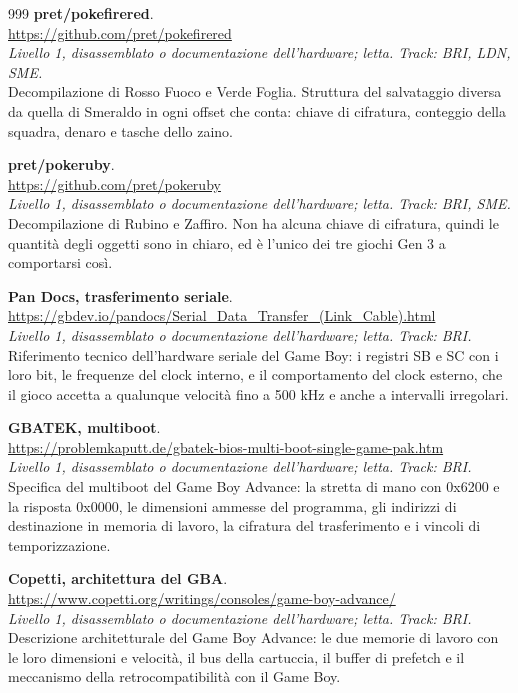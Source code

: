 \begin{thebibliography}{999}
  \textbf{pret/pokefirered}.
  \\ \url{https://github.com/pret/pokefirered}
  \\ \emph{Livello 1, disassemblato o documentazione dell'hardware; letta. Track: BRI, LDN, SME.}
  \\ Decompilazione di Rosso Fuoco e Verde Foglia. Struttura del salvataggio diversa da quella di Smeraldo in ogni offset che conta: chiave di cifratura, conteggio della squadra, denaro e tasche dello zaino.

  \textbf{pret/pokeruby}.
  \\ \url{https://github.com/pret/pokeruby}
  \\ \emph{Livello 1, disassemblato o documentazione dell'hardware; letta. Track: BRI, SME.}
  \\ Decompilazione di Rubino e Zaffiro. Non ha alcuna chiave di cifratura, quindi le quantità degli oggetti sono in chiaro, ed è l'unico dei tre giochi Gen 3 a comportarsi così.

  \textbf{Pan Docs, trasferimento seriale}.
  \\ \url{https://gbdev.io/pandocs/Serial_Data_Transfer_(Link_Cable).html}
  \\ \emph{Livello 1, disassemblato o documentazione dell'hardware; letta. Track: BRI.}
  \\ Riferimento tecnico dell'hardware seriale del Game Boy: i registri SB e SC con i loro bit, le frequenze del clock interno, e il comportamento del clock esterno, che il gioco accetta a qualunque velocità fino a 500 kHz e anche a intervalli irregolari.

  \textbf{GBATEK, multiboot}.
  \\ \url{https://problemkaputt.de/gbatek-bios-multi-boot-single-game-pak.htm}
  \\ \emph{Livello 1, disassemblato o documentazione dell'hardware; letta. Track: BRI.}
  \\ Specifica del multiboot del Game Boy Advance: la stretta di mano con 0x6200 e la risposta 0x0000, le dimensioni ammesse del programma, gli indirizzi di destinazione in memoria di lavoro, la cifratura del trasferimento e i vincoli di temporizzazione.

  \textbf{Copetti, architettura del GBA}.
  \\ \url{https://www.copetti.org/writings/consoles/game-boy-advance/}
  \\ \emph{Livello 1, disassemblato o documentazione dell'hardware; letta. Track: BRI.}
  \\ Descrizione architetturale del Game Boy Advance: le due memorie di lavoro con le loro dimensioni e velocità, il bus della cartuccia, il buffer di prefetch e il meccanismo della retrocompatibilità con il Game Boy.


\end{thebibliography}
